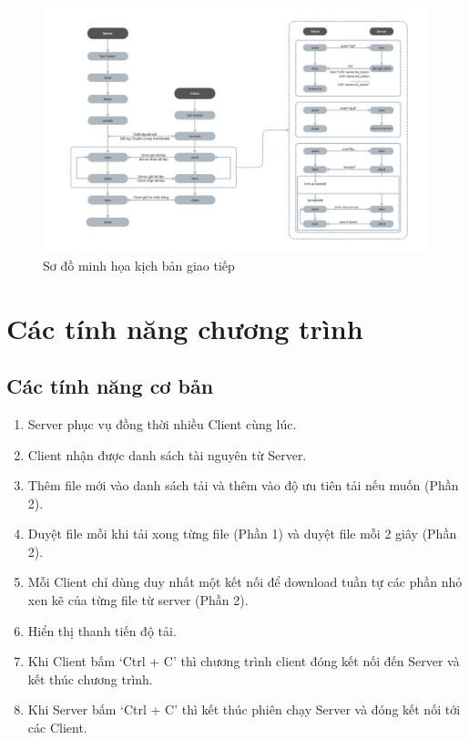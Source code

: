 \documentclass[a4paper,12pt]{report}
\begin{document}
\begin{itemize}
        \begin{figure}[ht]
          \centering
          \includegraphics[width=1\textwidth]{Screenshots/diagram.png}
          \caption{Sơ đồ minh họa kịch bản giao tiếp}\label{fig:diagram}
        \end{figure}
\end{itemize}

\pagebreak
\section{Các tính năng chương trình}
\subsection{Các tính năng cơ bản}
\begin{enumerate}
  \item Server phục vụ đồng thời nhiều Client cùng lúc.
  \item Client nhận được danh sách tài nguyên từ Server.
  \item Thêm file mới vào danh sách  tải và thêm vào độ ưu tiên tải nếu muốn (Phần 2).
  \item Duyệt file mỗi khi tải xong từng file (Phần 1) và duyệt file mỗi 2 giây (Phần 2).
  \item Mỗi Client chỉ dùng duy nhất một kết nối để download tuần tự các phần nhỏ xen kẽ của từng file từ server (Phần 2).
  \item Hiển thị thanh tiến độ tải.
  \item Khi Client bấm `Ctrl + C' thì chương trình client đóng kết nối đến Server và kết thúc chương trình.
  \item Khi Server bấm `Ctrl + C' thì kết thúc phiên chạy Server và đóng kết nối tới các Client.
\end{enumerate}
\end{document}
